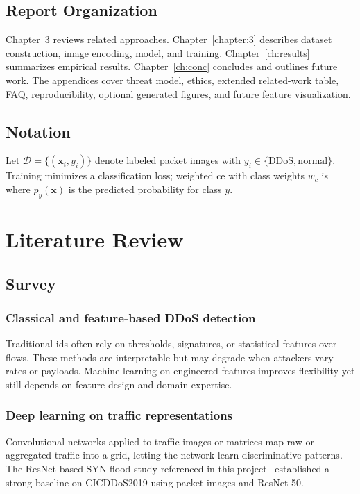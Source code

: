 \section{Report Organization}
Chapter~\ref{ch:lit} reviews related approaches. Chapter~\ref{chapter:3}
describes dataset construction, image encoding, model, and training. Chapter~\ref{ch:results}
summarizes empirical results. Chapter~\ref{ch:conc} concludes and outlines future work.
The appendices cover threat model, ethics, extended related-work table, FAQ,
reproducibility, optional generated figures, and future feature visualization.

\section{Notation}
\label{sec:notation}
Let $\mathcal{D} = \{(\mathbf{x}_i, y_i)\}$ denote labeled packet images with
$y_i \in \{\mathrm{DDoS}, \mathrm{normal}\}$. Training minimizes a classification
loss; weighted \gls{ce} with class weights $w_c$ is
where $p_{y}(\mathbf{x})$ is the predicted probability for class $y$.


\chapter{Literature Review}
\label{ch:lit}

\section{Survey}
\subsection{Classical and feature-based DDoS detection}
Traditional \gls{ids} often rely on thresholds, signatures, or statistical
features over flows. These methods are interpretable but may degrade when
attackers vary rates or payloads. Machine learning on engineered features improves
flexibility yet still depends on feature design and domain expertise.

\subsection{Deep learning on traffic representations}
Convolutional networks applied to traffic images or matrices map raw or
aggregated traffic into a grid, letting the network learn discriminative
patterns. The ResNet-based SYN flood study referenced in this
project~\cite{bazzi2022resnet} established a strong baseline on CICDDoS2019 using
packet images and ResNet-50.

